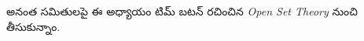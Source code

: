 \documentclass[../../../include/open-logic-chapter]{subfiles}
\begin{document}

\begin{editorial}
అనంత సమితులపై ఈ అధ్యాయం టిమ్ బటన్ రచించిన \emph{Open Set Theory}
నుంచి తీసుకున్నాం.
\end{editorial}

\end{document}
